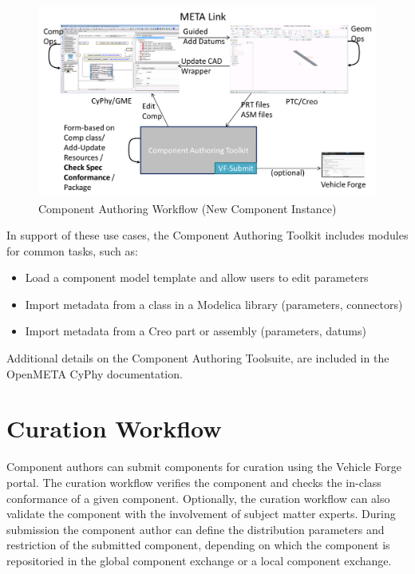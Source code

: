 \begin{figure}
\includegraphics*[width=\textwidth]{Authoring_workflow_2}
\caption{Component Authoring Workflow (New Component Instance)}
\label{Authoring_workflow_2}
\end{figure} 


In support of these use cases, the Component Authoring Toolkit includes modules for common tasks, such as:
\begin{itemize}
\item{Load a component model template and allow users to edit parameters}
\item{Import metadata from a class in a Modelica library (parameters, connectors)}
\item{Import metadata from a Creo part or assembly (parameters, datums)}
\end{itemize}

Additional details on the Component Authoring Toolsuite, are included in the OpenMETA CyPhy documentation.

\section{Curation Workflow}
Component authors can submit components for curation using the Vehicle Forge portal. The curation workflow verifies the component and checks the in-class conformance of a given component. Optionally, the curation workflow can also validate the component with the involvement of subject matter experts. During submission the component author can define the distribution parameters and restriction of the submitted component, depending on which the component is repositoried in the global component exchange or a local component exchange. 

